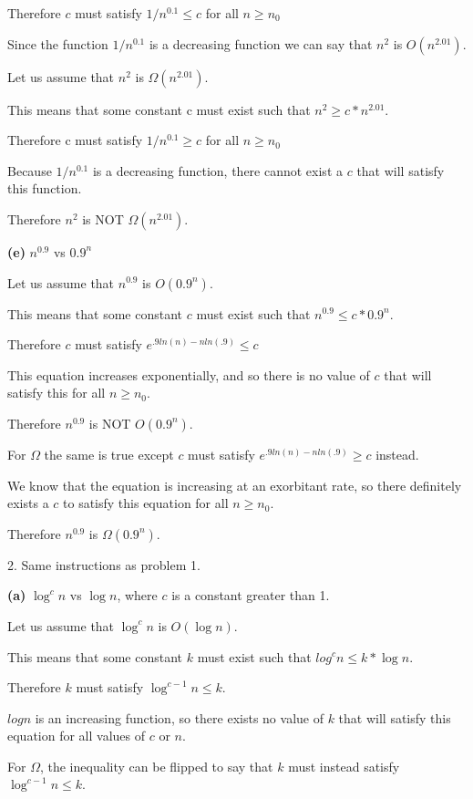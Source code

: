\documentclass[12pt]{report}
\begin{document}
Therefore $c$ must satisfy $1/{n^{0.1}} \leq c$ for all
$n \geq n_0$

Since the function $1/{n^{0.1}}$ is a decreasing function we can
say that $n^2$ is $O(n^{2.01})$.

Let us assume that $n^2$ is $\Omega(n^{2.01})$.

This means that some constant c must exist such that $n^2 \geq c * n^{2.01}$.

Therefore c must satisfy $1/n^0.1 \geq c$ for all $n\geq n_0$

Because $1/n^0.1$ is a decreasing function, there cannot exist a $c$ that will satisfy this function.

Therefore $n^2$ is NOT $\Omega(n^{2.01})$.

\textbf{(e)} $n^{0.9}$ vs $0.9^n$

Let us assume that $n^{0.9}$ is $O(0.9^n)$.

This means that some constant $c$ must exist such that $n^{0.9} \leq c * 0.9^n$.

Therefore $c$ must satisfy $e^{.9ln(n) - nln(.9)} \leq c$

This equation increases exponentially, and so there is no value of $c$ that will satisfy this
for all $n \geq n_0$.

Therefore $n^{0.9}$ is NOT $O(0.9^n)$.

For $\Omega$ the same is true except $c$ must satisfy  $e^{.9ln(n) - nln(.9)} \geq c$ instead.

We know that the equation is increasing at an exorbitant rate, so there definitely exists a
$c$ to satisfy this equation for all $n \geq n_0$.

Therefore $n^{0.9}$ is $\Omega(0.9^n)$.

\pagebreak

2. Same instructions as problem 1.

\textbf{(a)} $\log^c n$ vs $\log n$, where $c$ is a constant greater than 1.

Let us assume that $\log^c n$ is $O(\log n)$.

This means that some constant $k$ must exist such that $log^c n \leq k * \log n$.

Therefore $k$ must satisfy $\log^{c - 1}n \leq k$.

$log n$ is an increasing function, so there exists no value of $k$
that will satisfy this equation for all values of $c$ or $n$.

For $\Omega$, the inequality can be flipped to say that
$k$ must instead satisfy $\log^{c - 1}n \leq k$.
\end{document}
